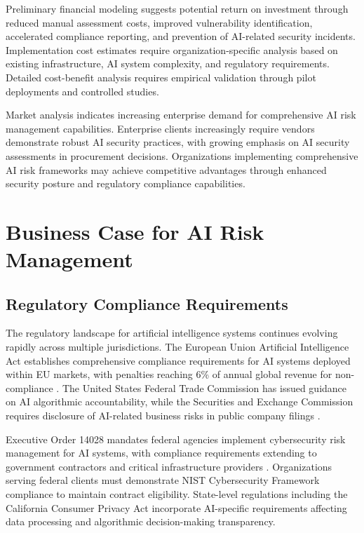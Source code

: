 \documentclass[11pt,letterpaper]{article}
\begin{document}
Preliminary financial modeling suggests potential return on investment through reduced manual assessment costs, improved vulnerability identification, accelerated compliance reporting, and prevention of AI-related security incidents. Implementation cost estimates require organization-specific analysis based on existing infrastructure, AI system complexity, and regulatory requirements. Detailed cost-benefit analysis requires empirical validation through pilot deployments and controlled studies.

Market analysis indicates increasing enterprise demand for comprehensive AI risk management capabilities. Enterprise clients increasingly require vendors demonstrate robust AI security practices, with growing emphasis on AI security assessments in procurement decisions. Organizations implementing comprehensive AI risk frameworks may achieve competitive advantages through enhanced security posture and regulatory compliance capabilities.

\section{Business Case for AI Risk Management}

\subsection{Regulatory Compliance Requirements}

The regulatory landscape for artificial intelligence systems continues evolving rapidly across multiple jurisdictions. The European Union Artificial Intelligence Act establishes comprehensive compliance requirements for AI systems deployed within EU markets, with penalties reaching 6\% of annual global revenue for non-compliance \cite{EUAI2024}. The United States Federal Trade Commission has issued guidance on AI algorithmic accountability, while the Securities and Exchange Commission requires disclosure of AI-related business risks in public company filings \cite{FTC2023, SEC2023}.

Executive Order 14028 mandates federal agencies implement cybersecurity risk management for AI systems, with compliance requirements extending to government contractors and critical infrastructure providers \cite{EO14028}. Organizations serving federal clients must demonstrate NIST Cybersecurity Framework compliance to maintain contract eligibility. State-level regulations including the California Consumer Privacy Act incorporate AI-specific requirements affecting data processing and algorithmic decision-making transparency.
\end{document}
